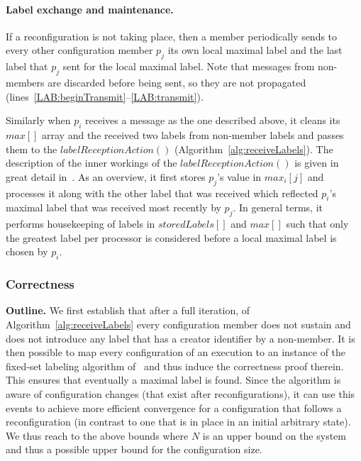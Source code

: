 \documentclass[11pt]{article}
\begin{document}
\paragraph{Label exchange and maintenance.} If a reconfiguration is not taking place, then a member periodically sends to every other configuration member $p_j$ its own local maximal label and the last label that $p_j$ sent for the local maximal label.
Note that messages from non-members are discarded before being sent, so they are not propagated (lines~\ref{LAB:beginTransmit}--\ref{LAB:transmit}).

Similarly when $p_i$ receives a message as the one described above, it cleans its $max[]$ array and the received two labels from non-member labels and passes them to the $labelReceptionAction()$ (Algorithm~\ref{alg:receiveLabels}).
The description of the inner workings of the $labelReceptionAction()$ is given in great detail in~\cite{SSVS}. 
As an overview, it first stores $p_j$'s value in $max_i[j]$ and processes it along with the other label that was received which reflected $p_i$'s maximal label that was received most recently by $p_j$.
In general terms, it performs housekeeping of labels in $storedLabels[]$ and $max[]$ such that only the greatest label per processor is considered before a local maximal label is chosen by $p_i$.

\subsubsection{Correctness}
\textbf{Outline.} We first establish that after a full iteration, of Algorithm~\ref{alg:receiveLabels} every configuration member does not sustain and does not introduce  any label that has a creator identifier by a non-member.
It is then possible to map every configuration of an execution to an instance of the fixed-set labeling algorithm of~\cite{SSVS} and thus induce the correctness proof therein.
This ensures that eventually a maximal label is found.
Since the algorithm is aware of configuration changes (that exist after reconfigurations), it can use this events to achieve more efficient convergence for a configuration that follows a reconfiguration (in contrast to one that is in place in an initial arbitrary state). 
We thus reach to the above bounds where $N$ is an upper bound on the system and thus a possible upper bound for the configuration size.
\end{document}
